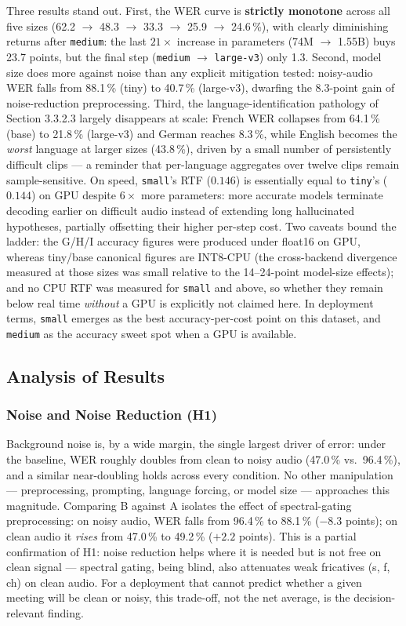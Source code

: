 \documentclass[12pt]{report}
\begin{document}
Three results stand out. First, the WER curve is \textbf{strictly monotone} across all five sizes (62.2 $\to$ 48.3 $\to$ 33.3 $\to$ 25.9 $\to$ 24.6\,\%), with clearly diminishing returns after \texttt{medium}: the last $21\times$ increase in parameters (74M $\to$ 1.55B) buys 23.7 points, but the final step (\texttt{medium} $\to$ \texttt{large-v3}) only 1.3. Second, model size does more against noise than any explicit mitigation tested: noisy-audio WER falls from 88.1\,\% (tiny) to 40.7\,\% (large-v3), dwarfing the 8.3-point gain of noise-reduction preprocessing. Third, the language-identification pathology of Section 3.3.2.3 largely disappears at scale: French WER collapses from 64.1\,\% (base) to 21.8\,\% (large-v3) and German reaches 8.3\,\%, while English becomes the \emph{worst} language at larger sizes (43.8\,\%), driven by a small number of persistently difficult clips --- a reminder that per-language aggregates over twelve clips remain sample-sensitive. On speed, \texttt{small}'s RTF ($0.146$) is essentially equal to \texttt{tiny}'s ($0.144$) on GPU despite $6\times$ more parameters: more accurate models terminate decoding earlier on difficult audio instead of extending long hallucinated hypotheses, partially offsetting their higher per-step cost. Two caveats bound the ladder: the G/H/I accuracy figures were produced under float16 on GPU, whereas tiny/base canonical figures are INT8-CPU (the cross-backend divergence measured at those sizes was small relative to the 14--24-point model-size effects); and no CPU RTF was measured for \texttt{small} and above, so whether they remain below real time \emph{without} a GPU is explicitly not claimed here. In deployment terms, \texttt{small} emerges as the best accuracy-per-cost point on this dataset, and \texttt{medium} as the accuracy sweet spot when a GPU is available.
\subsection{Analysis of Results}
\subsubsection{Noise and Noise Reduction (H1)}
Background noise is, by a wide margin, the single largest driver of error: under the baseline, WER roughly doubles from clean to noisy audio (47.0\,\% vs.\ 96.4\,\%), and a similar near-doubling holds across every condition. No other manipulation --- preprocessing, prompting, language forcing, or model size --- approaches this magnitude. Comparing B against A isolates the effect of spectral-gating preprocessing: on noisy audio, WER falls from 96.4\,\% to 88.1\,\% ($-8.3$ points); on clean audio it \emph{rises} from 47.0\,\% to 49.2\,\% ($+2.2$ points). This is a partial confirmation of H1: noise reduction helps where it is needed but is not free on clean signal --- spectral gating, being blind, also attenuates weak fricatives (s, f, ch) on clean audio. For a deployment that cannot predict whether a given meeting will be clean or noisy, this trade-off, not the net average, is the decision-relevant finding.
\end{document}
